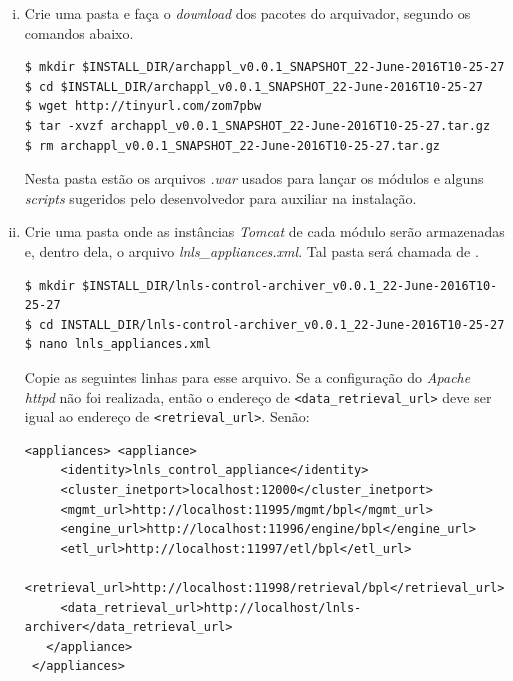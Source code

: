 \begin {enumerate}[i.] 
  \item Crie uma pasta e faça o \textit{download} dos pacotes do arquivador,
  segundo os comandos abaixo. 
\begin{lstlisting}[keywordstyle=\ttfamily, style=nonumbers]
$ mkdir $INSTALL_DIR/archappl_v0.0.1_SNAPSHOT_22-June-2016T10-25-27
$ cd $INSTALL_DIR/archappl_v0.0.1_SNAPSHOT_22-June-2016T10-25-27
$ wget http://tinyurl.com/zom7pbw
$ tar -xvzf archappl_v0.0.1_SNAPSHOT_22-June-2016T10-25-27.tar.gz
$ rm archappl_v0.0.1_SNAPSHOT_22-June-2016T10-25-27.tar.gz
\end{lstlisting}

Nesta pasta estão os arquivos \textit{.war}  usados para lançar os módulos e
alguns \textit{scripts} sugeridos pelo desenvolvedor para auxiliar na
instalação.
	
  \item \label{item:appl} Crie uma pasta onde as instâncias \textit{Tomcat} de cada módulo serão
  armazenadas e, dentro dela, o arquivo \textit{lnls\_appliances.xml}. Tal pasta
  será chamada de .

\begin{lstlisting}[keywordstyle=\ttfamily, style=nonumbers]
$ mkdir $INSTALL_DIR/lnls-control-archiver_v0.0.1_22-June-2016T10-25-27
$ cd INSTALL_DIR/lnls-control-archiver_v0.0.1_22-June-2016T10-25-27
$ nano lnls_appliances.xml
\end{lstlisting}

Copie as seguintes linhas para esse arquivo. Se a configuração do
\textit{Apache httpd} não foi realizada, então o endereço de
\texttt{<data\_retrieval\_url>} deve ser igual ao endereço de
\texttt{<retrieval\_url>}. Senão:

\begin{lstlisting}[keywordstyle=\ttfamily, style=nonumbers]
<appliances> <appliance>
     <identity>lnls_control_appliance</identity>
     <cluster_inetport>localhost:12000</cluster_inetport>
     <mgmt_url>http://localhost:11995/mgmt/bpl</mgmt_url>
     <engine_url>http://localhost:11996/engine/bpl</engine_url>
     <etl_url>http://localhost:11997/etl/bpl</etl_url>
     <retrieval_url>http://localhost:11998/retrieval/bpl</retrieval_url>
     <data_retrieval_url>http://localhost/lnls-archiver</data_retrieval_url>
   </appliance>
 </appliances>
\end{lstlisting} 


\end{enumerate}
